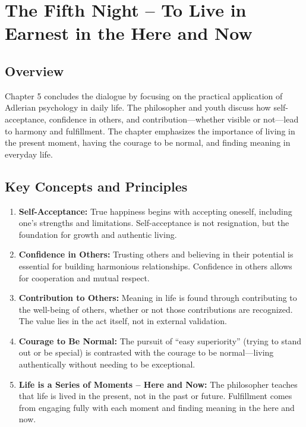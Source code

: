 \section{The Fifth Night – To Live in Earnest in the Here and Now}

\subsection*{Overview}
Chapter 5 concludes the dialogue by focusing on the practical application of Adlerian psychology in daily life. The philosopher and youth discuss how self-acceptance, confidence in others, and contribution—whether visible or not—lead to harmony and fulfillment. The chapter emphasizes the importance of living in the present moment, having the courage to be normal, and finding meaning in everyday life.

\subsection*{Key Concepts and Principles}
\begin{enumerate}
    \item \textbf{Self-Acceptance:} True happiness begins with accepting oneself, including one’s strengths and limitations. Self-acceptance is not resignation, but the foundation for growth and authentic living.
    \item \textbf{Confidence in Others:} Trusting others and believing in their potential is essential for building harmonious relationships. Confidence in others allows for cooperation and mutual respect.
    \item \textbf{Contribution to Others:} Meaning in life is found through contributing to the well-being of others, whether or not those contributions are recognized. The value lies in the act itself, not in external validation.
    \item \textbf{Courage to Be Normal:} The pursuit of “easy superiority” (trying to stand out or be special) is contrasted with the courage to be normal—living authentically without needing to be exceptional.
    \item \textbf{Life is a Series of Moments – Here and Now:} The philosopher teaches that life is lived in the present, not in the past or future. Fulfillment comes from engaging fully with each moment and finding meaning in the here and now.
\end{enumerate}

